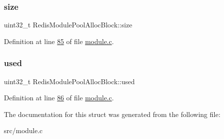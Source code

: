\subsubsection{\texorpdfstring{size}{size}}
{\footnotesize\ttfamily uint32\+\_\+t Redis\+Module\+Pool\+Alloc\+Block\+::size}



Definition at line \hyperlink{module_8c_source_l00085}{85} of file \hyperlink{module_8c_source}{module.\+c}.

\mbox{\label{structRedisModulePoolAllocBlock_a1c1dc77f687a3100278752c41e07560d}} 
\subsubsection{\texorpdfstring{used}{used}}
{\footnotesize\ttfamily uint32\+\_\+t Redis\+Module\+Pool\+Alloc\+Block\+::used}



Definition at line \hyperlink{module_8c_source_l00086}{86} of file \hyperlink{module_8c_source}{module.\+c}.



The documentation for this struct was generated from the following file\+:\begin{DoxyCompactItemize}
\item 
src/module.\+c\end{DoxyCompactItemize}
